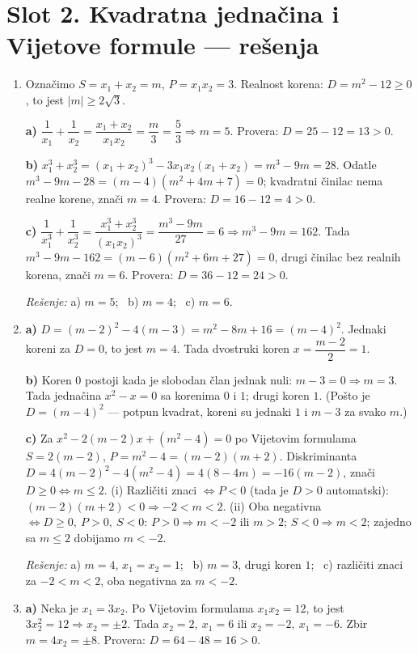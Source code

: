 \section*{Slot 2. Kvadratna jednačina i Vijetove formule — rešenja}
\begin{enumerate}[label=\arabic*.]
\item Označimo $S=x_1+x_2=m$, $P=x_1x_2=3$. Realnost korena: $D=m^{2}-12\ge0$, to jest $|m|\ge2\sqrt3$.

\textbf{a)} $\dfrac{1}{x_1}+\dfrac{1}{x_2}=\dfrac{x_1+x_2}{x_1x_2}=\dfrac{m}{3}=\dfrac{5}{3}\Rightarrow m=5$. Provera: $D=25-12=13>0$.

\textbf{b)} $x_1^{3}+x_2^{3}=(x_1+x_2)^{3}-3x_1x_2(x_1+x_2)=m^{3}-9m=28$. Odatle $m^{3}-9m-28=(m-4)(m^{2}+4m+7)=0$; kvadratni činilac nema realne korene, znači $m=4$. Provera: $D=16-12=4>0$.

\textbf{c)} $\dfrac{1}{x_1^{3}}+\dfrac{1}{x_2^{3}}=\dfrac{x_1^{3}+x_2^{3}}{(x_1x_2)^{3}}=\dfrac{m^{3}-9m}{27}=6\Rightarrow m^{3}-9m=162$. Tada $m^{3}-9m-162=(m-6)(m^{2}+6m+27)=0$, drugi činilac bez realnih korena, znači $m=6$. Provera: $D=36-12=24>0$.

\emph{Rešenje:} a) $m=5$; \ b) $m=4$; \ c) $m=6$.

\item \textbf{a)} $D=(m-2)^{2}-4(m-3)=m^{2}-8m+16=(m-4)^{2}$. Jednaki koreni za $D=0$, to jest $m=4$. Tada dvostruki koren $x=\dfrac{m-2}{2}=1$.

\textbf{b)} Koren $0$ postoji kada je slobodan član jednak nuli: $m-3=0\Rightarrow m=3$. Tada jednačina $x^{2}-x=0$ sa korenima $0$ i $1$; drugi koren $1$. (Pošto je $D=(m-4)^{2}$ — potpun kvadrat, koreni su jednaki $1$ i $m-3$ za svako $m$.)

\textbf{c)} Za $x^{2}-2(m-2)x+(m^{2}-4)=0$ po Vijetovim formulama $S=2(m-2)$, $P=m^{2}-4=(m-2)(m+2)$. Diskriminanta $D=4(m-2)^{2}-4(m^{2}-4)=4(8-4m)=-16(m-2)$, znači $D\ge0\Leftrightarrow m\le2$.
(i) Različiti znaci $\Leftrightarrow P<0$ (tada je $D>0$ automatski): $(m-2)(m+2)<0\Rightarrow -2<m<2$.
(ii) Oba negativna $\Leftrightarrow D\ge0,\ P>0,\ S<0$: $P>0\Rightarrow m<-2$ ili $m>2$; $S<0\Rightarrow m<2$; zajedno sa $m\le2$ dobijamo $m<-2$.

\emph{Rešenje:} a) $m=4$, $x_1=x_2=1$; \ b) $m=3$, drugi koren $1$; \ c) različiti znaci za $-2<m<2$, oba negativna za $m<-2$.

\item \textbf{a)} Neka je $x_1=3x_2$. Po Vijetovim formulama $x_1x_2=12$, to jest $3x_2^{2}=12\Rightarrow x_2=\pm2$. Tada $x_2=2,\ x_1=6$ ili $x_2=-2,\ x_1=-6$. Zbir $m=4x_2=\pm8$. Provera: $D=64-48=16>0$.


\end{enumerate}
